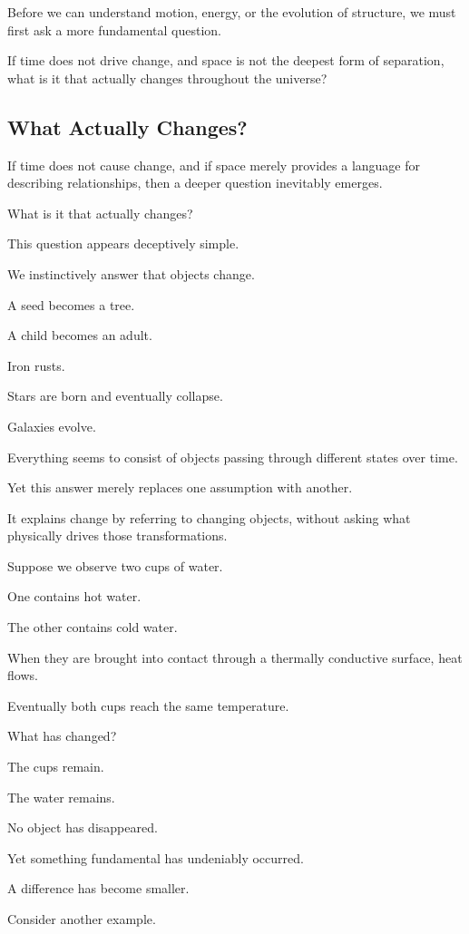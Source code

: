 Before we can understand motion, energy, or the evolution of structure, we must first ask a more fundamental question.

If time does not drive change, and space is not the deepest form of separation, what is it that actually changes throughout the universe?

\subsection{\textbf{What Actually Changes?}} 

If time does not cause change, and if space merely provides a language for describing relationships, then a deeper question inevitably emerges.

What is it that actually changes?

This question appears deceptively simple.

We instinctively answer that objects change.

A seed becomes a tree.

A child becomes an adult.

Iron rusts.

Stars are born and eventually collapse.

Galaxies evolve.

Everything seems to consist of objects passing through different states over time.

Yet this answer merely replaces one assumption with another.

It explains change by referring to changing objects, without asking what physically drives those transformations.

Suppose we observe two cups of water.

One contains hot water.

The other contains cold water.

When they are brought into contact through a thermally conductive surface, heat flows.

Eventually both cups reach the same temperature.

What has changed?

The cups remain.

The water remains.

No object has disappeared.

Yet something fundamental has undeniably occurred.

A difference has become smaller.

Consider another example.

